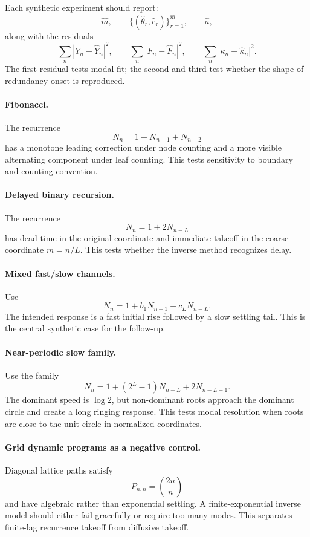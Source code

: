 \documentclass[10pt,twocolumn]{article}
\begin{document}
Each synthetic experiment should report:
\[
        \widehat m,\qquad
        \{(\widehat\theta_r,\widehat c_r)\}_{r=1}^{\widehat m},
        \qquad
        \widehat a,
\]
along with the residuals
\[
        \sum_n |Y_n-\widehat Y_n|^2,
        \qquad
        \sum_n |F_n-\widehat F_n|^2,
        \qquad
        \sum_n |\kappa_n-\widehat\kappa_n|^2.
\]
The first residual tests modal fit; the second and third test whether the
shape of redundancy onset is reproduced.

\paragraph{Fibonacci.}
The recurrence
\[
        N_n=1+N_{n-1}+N_{n-2}
\]
has a monotone leading correction under node counting and a more visible
alternating component under leaf counting. This tests sensitivity to boundary
and counting convention.

\paragraph{Delayed binary recursion.}
The recurrence
\[
        N_n=1+2N_{n-L}
\]
has dead time in the original coordinate and immediate takeoff in the coarse
coordinate \(m=n/L\). This tests whether the inverse method recognizes delay.

\paragraph{Mixed fast/slow channels.}
Use
\[
        N_n=1+b_1N_{n-1}+c_LN_{n-L}.
\]
The intended response is a fast initial rise followed by a slow settling tail.
This is the central synthetic case for the follow-up.

\paragraph{Near-periodic slow family.}
Use the family
\[
        N_n=1+(2^L-1)N_{n-L}+2N_{n-L-1}.
\]
The dominant speed is \(\log 2\), but non-dominant roots approach the dominant
circle and create a long ringing response. This tests modal resolution when
roots are close to the unit circle in normalized coordinates.

\paragraph{Grid dynamic programs as a negative control.}
Diagonal lattice paths satisfy
\[
        P_{n,n}=\binom{2n}{n}
\]
and have algebraic rather than exponential settling. A finite-exponential
inverse model should either fail gracefully or require too many modes. This
separates finite-lag recurrence takeoff from diffusive takeoff.
\end{document}
